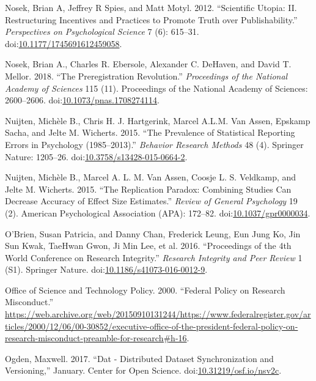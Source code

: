 \documentclass[a5paper]{book}
\begin{document}
\hypertarget{ref-doi:10.1177ux2f1745691612459058}{}
Nosek, Brian A, Jeffrey R Spies, and Matt Motyl. 2012. ``Scientific
Utopia: II. Restructuring Incentives and Practices to Promote Truth over
Publishability.'' \emph{Perspectives on Psychological Science} 7 (6):
615--31.
doi:\href{https://doi.org/10.1177/1745691612459058}{10.1177/1745691612459058}.

\hypertarget{ref-doi:10.1073ux2fpnas.1708274114}{}
Nosek, Brian A., Charles R. Ebersole, Alexander C. DeHaven, and David T.
Mellor. 2018. ``The Preregistration Revolution.'' \emph{Proceedings of
the National Academy of Sciences} 115 (11). Proceedings of the National
Academy of Sciences: 2600--2606.
doi:\href{https://doi.org/10.1073/pnas.1708274114}{10.1073/pnas.1708274114}.

\hypertarget{ref-doi:10.3758ux2fs13428-015-0664-2}{}
Nuijten, Michèle B., Chris H. J. Hartgerink, Marcel A.L.M. Van Assen,
Epskamp Sacha, and Jelte M. Wicherts. 2015. ``The Prevalence of
Statistical Reporting Errors in Psychology (1985--2013).''
\emph{Behavior Research Methods} 48 (4). Springer Nature: 1205--26.
doi:\href{https://doi.org/10.3758/s13428-015-0664-2}{10.3758/s13428-015-0664-2}.

\hypertarget{ref-doi:10.1037ux2fgpr0000034}{}
Nuijten, Michèle B., Marcel A. L. M. Van Assen, Coosje L. S. Veldkamp,
and Jelte M. Wicherts. 2015. ``The Replication Paradox: Combining
Studies Can Decrease Accuracy of Effect Size Estimates.'' \emph{Review
of General Psychology} 19 (2). American Psychological Association (APA):
172--82.
doi:\href{https://doi.org/10.1037/gpr0000034}{10.1037/gpr0000034}.

\hypertarget{ref-doi:10.1186ux2fs41073-016-0012-9}{}
O'Brien, Susan Patricia, and Danny Chan, Frederick Leung, Eun Jung Ko,
Jin Sun Kwak, TaeHwan Gwon, Ji Min Lee, et al. 2016. ``Proceedings of
the 4th World Conference on Research Integrity.'' \emph{Research
Integrity and Peer Review} 1 (S1). Springer Nature.
doi:\href{https://doi.org/10.1186/s41073-016-0012-9}{10.1186/s41073-016-0012-9}.

\hypertarget{ref-ostp2000}{}
Office of Science and Technology Policy. 2000. ``Federal Policy on
Research Misconduct.''
\url{https://web.archive.org/web/20150910131244/https://www.federalregister.gov/articles/2000/12/06/00-30852/executive-office-of-the-president-federal-policy-on-research-misconduct-preamble-for-research\#h-16}.

\hypertarget{ref-doi:10.31219ux2fosf.ioux2fnsv2c}{}
Ogden, Maxwell. 2017. ``Dat - Distributed Dataset Synchronization and
Versioning,'' January. Center for Open Science.
doi:\href{https://doi.org/10.31219/osf.io/nsv2c}{10.31219/osf.io/nsv2c}.
\end{document}

